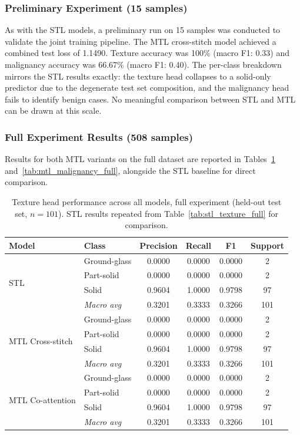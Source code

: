 \subsubsection{Preliminary Experiment (15 samples)}

As with the STL models, a preliminary run on 15 samples was conducted to validate the joint training pipeline. The MTL cross-stitch model achieved a combined test loss of 1.1490. Texture accuracy was 100\% (macro F1: 0.33) and malignancy accuracy was 66.67\% (macro F1: 0.40). The per-class breakdown mirrors the STL results exactly: the texture head collapses to a solid-only predictor due to the degenerate test set composition, and the malignancy head fails to identify benign cases. No meaningful comparison between STL and MTL can be drawn at this scale.

\subsubsection{Full Experiment Results (508 samples)}

Results for both MTL variants on the full dataset are reported in Tables~\ref{tab:mtl_texture_full} and~\ref{tab:mtl_malignancy_full}, alongside the STL baseline for direct comparison.

\begin{table}[h]
\centering
\caption{Texture head performance across all models, full experiment (held-out test set, $n=101$). STL results repeated from Table~\ref{tab:stl_texture_full} for comparison.}
\label{tab:mtl_texture_full}
\begin{tabular}{llcccc}
\hline
\textbf{Model} & \textbf{Class} & \textbf{Precision} & \textbf{Recall}
  & \textbf{F1} & \textbf{Support} \\
\hline
\multirow{4}{*}{STL}
  & Ground-glass & 0.0000 & 0.0000 & 0.0000 & 2 \\
  & Part-solid   & 0.0000 & 0.0000 & 0.0000 & 2 \\
  & Solid        & 0.9604 & 1.0000 & 0.9798 & 97 \\
  & \textit{Macro avg} & 0.3201 & 0.3333 & 0.3266 & 101 \\
\hline
\multirow{4}{*}{MTL Cross-stitch}
  & Ground-glass & 0.0000 & 0.0000 & 0.0000 & 2 \\
  & Part-solid   & 0.0000 & 0.0000 & 0.0000 & 2 \\
  & Solid        & 0.9604 & 1.0000 & 0.9798 & 97 \\
  & \textit{Macro avg} & 0.3201 & 0.3333 & 0.3266 & 101 \\
\hline
\multirow{4}{*}{MTL Co-attention}
  & Ground-glass & 0.0000 & 0.0000 & 0.0000 & 2 \\
  & Part-solid   & 0.0000 & 0.0000 & 0.0000 & 2 \\
  & Solid        & 0.9604 & 1.0000 & 0.9798 & 97 \\
  & \textit{Macro avg} & 0.3201 & 0.3333 & 0.3266 & 101 \\
\hline
\end{tabular}
\end{table}


